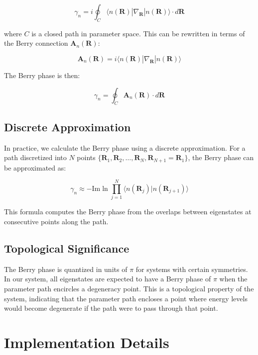 \documentclass{article}
\begin{document}
\begin{equation}
\gamma_n = i \oint_C \langle n(\mathbf{R})|\nabla_\mathbf{R}|n(\mathbf{R})\rangle \cdot d\mathbf{R}
\end{equation}

where $C$ is a closed path in parameter space. This can be rewritten in terms of the Berry connection $\mathbf{A}_n(\mathbf{R})$:

\begin{equation}
\mathbf{A}_n(\mathbf{R}) = i\langle n(\mathbf{R})|\nabla_\mathbf{R}|n(\mathbf{R})\rangle
\end{equation}

The Berry phase is then:

\begin{equation}
\gamma_n = \oint_C \mathbf{A}_n(\mathbf{R}) \cdot d\mathbf{R}
\end{equation}

\subsection{Discrete Approximation}

In practice, we calculate the Berry phase using a discrete approximation. For a path discretized into $N$ points $\{\mathbf{R}_1, \mathbf{R}_2, \ldots, \mathbf{R}_N, \mathbf{R}_{N+1}=\mathbf{R}_1\}$, the Berry phase can be approximated as:

\begin{equation}
\gamma_n \approx -\text{Im}\ln \prod_{j=1}^{N} \langle n(\mathbf{R}_j)|n(\mathbf{R}_{j+1})\rangle
\end{equation}

This formula computes the Berry phase from the overlaps between eigenstates at consecutive points along the path.

\subsection{Topological Significance}

The Berry phase is quantized in units of $\pi$ for systems with certain symmetries. In our system, all eigenstates are expected to have a Berry phase of $\pi$ when the parameter path encircles a degeneracy point. This is a topological property of the system, indicating that the parameter path encloses a point where energy levels would become degenerate if the path were to pass through that point.

\section{Implementation Details}
\end{document}
